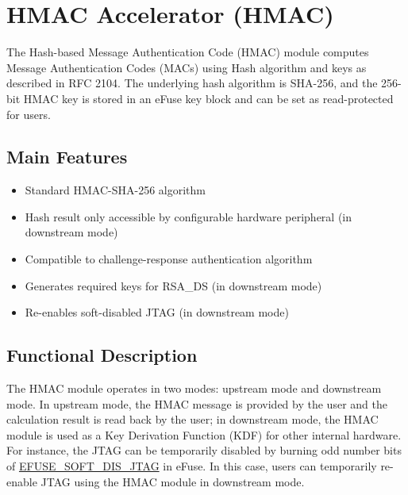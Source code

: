 \documentclass[main\_\_EN.tex]{subfiles}
\begin{document}

\ifglobal
\else
    {\let\clearpage\relax \listoftodos}
    \tableofcontents
\fi




\hypertarget{hmac}{}
\chapter{HMAC Accelerator (HMAC)}
\label{mod:hmac}


The Hash-based Message Authentication Code (HMAC) module computes Message Authentication Codes (MACs) using Hash algorithm and keys as described in RFC 2104. The underlying hash algorithm is SHA-256, and the 256-bit HMAC key is stored in an eFuse key block and can be set as read-protected for users.

\section{Main Features}
\begin{itemize}
    \item Standard HMAC-SHA-256 algorithm
    \item Hash result only accessible by configurable hardware peripheral (in downstream mode)
    \item Compatible to challenge-response authentication algorithm
    \item Generates required keys for RSA\_DS (in downstream mode)
    \item Re-enables soft-disabled JTAG (in downstream mode)
\end{itemize}

\section{Functional Description}

The HMAC module operates in two modes: upstream mode and downstream mode. In upstream mode, the HMAC message is provided by the user and the calculation result is read back by the user; in downstream mode, the HMAC module is used as a Key Derivation Function (KDF) for other internal hardware. For instance, the JTAG can be temporarily disabled by burning odd number bits of \hyperref[fielddesc:EFUSESOFTDISJTAG]{EFUSE\_SOFT\_DIS\_JTAG} in eFuse. In this case, users can temporarily re-enable JTAG using the HMAC module in downstream mode.
\end{document}
